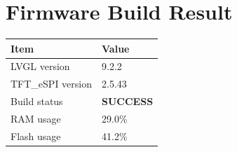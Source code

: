 \documentclass[a4paper,11pt]{article}
\begin{document}
\section{Firmware Build Result}

\begin{center}
\begin{tabular}{ll}
\toprule
\textbf{Item} & \textbf{Value} \\
\midrule
LVGL version & 9.2.2 \\
TFT\_eSPI version & 2.5.43 \\
Build status & \textcolor{green!60!black}{\textbf{SUCCESS}} \\
RAM usage & 29.0\% \\
Flash usage & 41.2\% \\
\bottomrule
\end{tabular}
\end{center}
\end{document}
